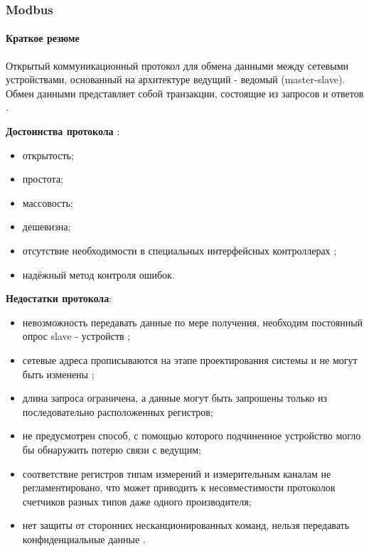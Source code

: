 \subsubsection{Modbus}\label{par:modbus}
\paragraph{Краткое резюме}
Открытый коммуникационный протокол для обмена данными между сетевыми устройствами, основанный на архитектуре ведущий - ведомый (master-slave). Обмен данными представляет собой транзакции, состоящие
из запросов и ответов \cite{__2017-1}. 

\textbf{Достоинства протокола} \cite{__2016}:
\begin{itemize}
	\item открытость;
	\item простота;
	\item массовость;
	\item дешевизна;
	\item отсутствие необходимости в специальных интерфейсных контроллерах \cite{__2010};
	\item надёжный метод контроля ошибок.
\end{itemize}

\textbf{Недостатки протокола}:
\begin{itemize}
	\item невозможность передавать данные по мере получения, необходим постоянный опрос slave - устройств \cite{__2010};
	\item сетевые адреса прописываются на этапе проектирования системы и не могут быть изменены \cite{__2017-1};
	\item длина запроса ограничена, а данные могут быть запрошены только из последовательно расположенных регистров;
	\item не предусмотрен способ, с помощью которого подчиненное устройство могло бы обнаружить потерю связи с ведущим;
	\item соответствие регистров типам измерений и измерительным каналам не регламентировано, что может приводить к несовместимости протоколов
	счетчиков разных типов даже одного производителя;
	\item нет защиты от сторонних несканционированных команд, нельзя передавать конфиденциальные данные \cite{_modbus_2021}.
\end{itemize}

